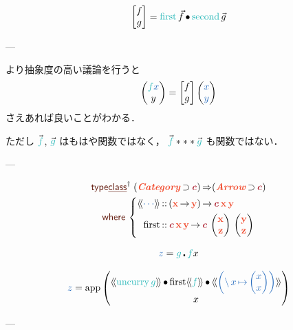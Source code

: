 \documentclass[a5paper,twoside,fleqn,draft]{jsbook}
\begin{document}
\begin{equation}
  \begin{bmatrix}
    f\\g
  \end{bmatrix}
  =\mFirst\Vec{f}\mCompCat\mSecond\Vec{g}
\end{equation}

---

より抽象度の高い議論を行うと
\begin{equation}
  \hPairWith{\hFunc{f}\hVar{x}}{y}
  =\begin{bmatrix}f\\g\end{bmatrix}
  \hPairWith{\hVar{x}}{\hVar{y}}
\end{equation}
さえあれば良いことがわかる．


ただし $\Vec{\hFunc{f}}$, $\Vec{\hFunc{g}}$ はもはや関数ではなく，
$\Vec{\hFunc{f}}***\Vec{\hFunc{g}}$ も関数ではない．

---

\newcommand{\mFirstFunc}{\mathop{\mathrm{first}}}

\begin{multline}
  \mTypeClassDeclPolymorphic\;
  (\mCatTypeClass\hHasElementsOf\mTypeConstructor{c})
  \hAndThen(\mArrowTypeClass\hHasElementsOf\mTypeConstructor{c})\\
  \mWhere{}\left\{
  \begin{aligned}
    \mArrowWith{\dotsb}
    &\hIsTypeOf{}(\mX\hFunctionArrow\mY)\hFunctionArrow\mTypeConstructor{c}\,\mX\,\mY\\
    \mFirstFunc
    &\hIsTypeOf{}\mTypeConstructor{c}\,\mX\,\mY
    \hFunctionArrow\mTypeConstructor{c}\,\hPairWith{\mX}{\mZ}\,\hPairWith{\mY}{\mZ}
  \end{aligned}
  \right.
\end{multline}

\begin{equation}
  \hVar{z}=\hFunc{g}\hCompose \hFunc{f} x
\end{equation}

\begin{equation}
  \hVar{z}=\mathop{\mathrm{app}}\hPairWith{\mArrowWith{\hUncurry \hFunc{g}}\mCompCat\mFirstFunc\mArrowWith{\hFunc{f}}\mCompCat{}\mArrowWith{\left(\mLambda x\mLambdaArrow\hPairWith{x}{x}\right)}}{x}
\end{equation}

---


\newcommand{\mUncircuit}{\mathop{\mathrm{uncircuit}}}
\newcommand{\mCircuitType}{\mTypeConstructor{Circ}}
\newcommand{\mCircuitWith}[1]{\mValueWith{Circ}{#1}}
\end{document}
